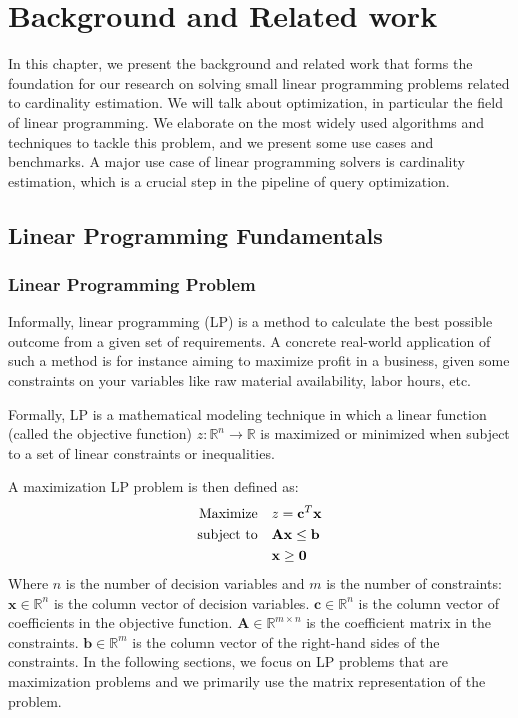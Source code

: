 
\chapter{Background and Related work}\label{chapter:relatedwork}

In this chapter, we present the background and related work that forms the foundation for our research on solving small linear programming problems related to cardinality estimation. We will talk about optimization, in particular the field of linear programming. We elaborate on the most widely used algorithms and techniques to tackle this problem, and we present some use cases and benchmarks. A major use case of linear programming solvers is cardinality estimation, which is a crucial step in the pipeline of query optimization.

\section{Linear Programming Fundamentals}

\subsection{Linear Programming Problem}
Informally, linear programming (LP) is a method to calculate the best possible outcome from a given set of requirements. A concrete real-world application of such a method is for instance aiming to maximize profit in a business, given some constraints on your variables like raw material availability, labor hours, etc.

Formally, LP is a mathematical modeling technique in which a linear function (called the objective function) \( z: \mathbb{R}^n \to \mathbb{R} \) is maximized or minimized when subject to a set of linear constraints or inequalities.

A maximization LP problem is then defined as:
\begin{align}
    \text{Maximize} \quad   & z = \mathbf{c}^T \mathbf{x} \notag            \\
    \text{subject to} \quad & \mathbf{A} \mathbf{x} \leq \mathbf{b} \notag  \\
                            & \mathbf{x} \geq \mathbf{0} \label{LP_Problem}
\end{align}
Where $n$ is the number of decision variables and $m$ is the number of constraints:
\(\mathbf{x} \in \mathbb{R}^n\) is the column vector of decision variables.
\(\mathbf{c} \in \mathbb{R}^n\) is the column vector of coefficients in the objective function.
\(\mathbf{A} \in \mathbb{R}^{m \times n}\) is the coefficient matrix in the constraints.
\(\mathbf{b} \in \mathbb{R}^m\) is the column vector of the right-hand sides of the constraints.
In the following sections, we focus on LP problems that are maximization problems and we primarily
use the matrix representation of the problem.

